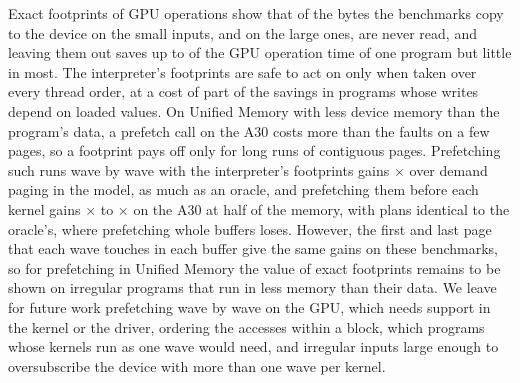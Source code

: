 \documentclass[11pt]{article}
\begin{document}
Exact footprints of GPU operations show that \numSmallTrHtoDUnneeded{} of the bytes the benchmarks copy to the device
on the small inputs, and \numLargeTrHtoDUnneeded{} on the large ones, are never read, and leaving them out saves
up to \numLargeTrMax{} of the GPU operation time of one program but little in most. The interpreter's footprints are
safe to act on only when taken over every thread order, at a cost of part of the savings in programs whose writes
depend on loaded values. On Unified Memory with less device memory than the program's data, a prefetch call on the A30 costs
more than the faults on a few pages, so a footprint pays off only for long runs of contiguous pages. Prefetching
such runs wave by wave with the interpreter's footprints gains \numUvmWLargeFourHyMin{}$\times$ over demand paging in
the model, as much as an oracle, and prefetching them before each kernel gains \numHwHalfHyMinAll{}$\times$ to
\numHwHalfTrMinAll{}$\times$ on the A30 at half of the memory, with plans identical to the oracle's, where
prefetching whole buffers loses. However, the first and last page that each wave touches in each buffer give the
same gains on these benchmarks, so for prefetching in Unified Memory the value of exact footprints remains to be
shown on irregular programs that run in less memory than their data. We leave for future work prefetching wave by
wave on the GPU, which needs support in the kernel or the driver, ordering the accesses within a block, which
programs whose kernels run as one wave would need, and irregular inputs large enough to oversubscribe the device
with more than one wave per kernel.




\end{document}

